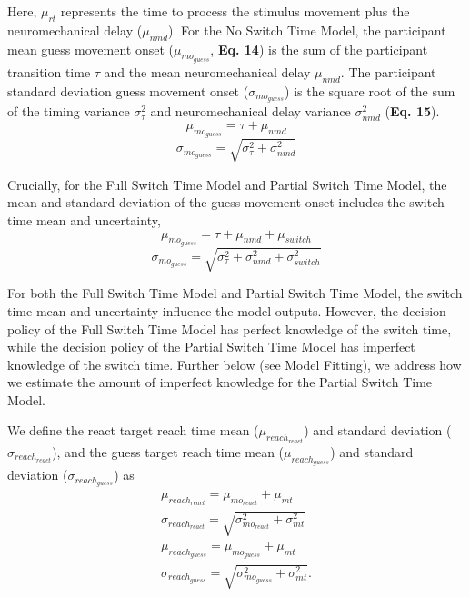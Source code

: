 \documentclass[12pt]{article}
\newcommand\boldblue[1]{\textcolor{mydarkblue}{\textbf{#1}}}
\begin{document}
Here, $\mu_{rt}$ represents the time to process the stimulus movement plus the neuromechanical delay ($\mu_{nmd}$).
For the No Switch Time Model, the participant mean guess movement onset ($\mu_{mo_{guess}}$, \boldblue{Eq. 14}) is the sum of the participant transition time $\tau$ and the mean neuromechanical delay $\mu_{nmd}$. The participant standard deviation guess movement onset ($\sigma_{mo_{guess}}$) is the square root of the sum of the timing variance $\sigma_{\tau}^2$ and neuromechanical delay variance $\sigma_{nmd}^2$ (\boldblue{Eq. 15}).
%
\begin{equation}
    \mu_{mo_{guess}} = \tau +  \mu_{nmd}
\end{equation}
\begin{equation}
    \sigma_{mo_{guess}} = \sqrt{\sigma_{\tau}^2 + \sigma_{nmd}^2}
\end{equation}

Crucially, for the Full Switch Time Model and Partial Switch Time Model, the mean and standard deviation of the guess movement onset includes the switch time mean and uncertainty,
\begin{equation}
    \mu_{mo_{guess}} = \tau +  \mu_{nmd} + \mu_{switch}
\end{equation}
\begin{equation}
    \sigma_{mo_{guess}} = \sqrt{\sigma_{\tau}^2 + \sigma_{nmd}^2 + \sigma_{switch}^2}
\end{equation}

For both the Full Switch Time Model and Partial Switch Time Model, the switch time mean and uncertainty influence the model outputs. However, the decision policy of the Full Switch Time Model has perfect knowledge of the switch time, while the decision policy of the Partial Switch Time Model has imperfect knowledge of the switch time. Further below (see Model Fitting), we address how we estimate the amount of imperfect knowledge for the Partial Switch Time Model.

We define the react target reach time mean ($\mu_{reach_{react}}$) and standard deviation ($\sigma_{reach_{react}}$), and the  guess target reach time mean ($\mu_{reach_{guess}}$) and standard deviation ($\sigma_{reach_{guess}}$) as
\begin{align}
    \mu_{reach_{react}} =\mu_{mo_{react}} + \mu_{mt}                      \\
    \sigma_{reach_{react}} = \sqrt{\sigma_{mo_{react}}^2 + \sigma_{mt}^2} \\
    \mu_{reach_{guess}} =\mu_{mo_{guess}} + \mu_{mt}                      \\
    \sigma_{reach_{guess}} = \sqrt{\sigma_{mo_{guess}}^2 + \sigma_{mt}^2}.
\end{align}
\end{document}
